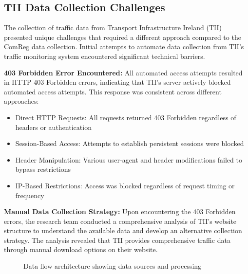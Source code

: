 \documentclass[MScCS]{uccthesis}
\begin{document}
   \subsection{TII Data Collection Challenges}
   The collection of traffic data from Transport Infrastructure Ireland (TII) presented unique challenges that required a different approach compared to the ComReg data collection. Initial attempts to automate data collection from TII's traffic monitoring system encountered significant technical barriers.

   \textbf{403 Forbidden Error Encountered:}
   All automated access attempts resulted in HTTP 403 Forbidden errors, indicating that TII's server actively blocked automated access attempts. This response was consistent across different approaches:
   \begin{itemize}
   \item Direct HTTP Requests: All requests returned 403 Forbidden regardless of headers or authentication
   \item Session-Based Access: Attempts to establish persistent sessions were blocked
   \item Header Manipulation: Various user-agent and header modifications failed to bypass restrictions
   \item IP-Based Restrictions: Access was blocked regardless of request timing or frequency
   \end{itemize}

   \textbf{Manual Data Collection Strategy:}
   Upon encountering the 403 Forbidden errors, the research team conducted a comprehensive analysis of TII's website structure to understand the available data and develop an alternative collection strategy. The analysis revealed that TII provides comprehensive traffic data through manual download options on their website.

   
   \begin{figure}[htbp]
   \centering
   \caption{Data flow architecture showing data sources and processing}
   \label{fig:data_architecture}
   \end{figure}
\end{document}
